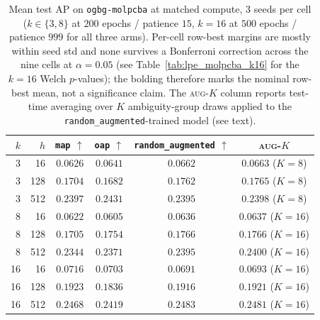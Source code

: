 \documentclass{article}
\theoremstyle{definition}
\theoremstyle{plain}
\begin{document}
\begin{table}[h]
\centering
\caption{Mean test AP on \texttt{ogbg-molpcba} at matched compute,
$3$ seeds per cell ($k\!\in\!\{3,8\}$ at $200$ epochs / patience $15$,
$k\!=\!16$ at $500$ epochs / patience $999$ for all three arms).
Per-cell row-best margins are mostly within seed std and none survives
a Bonferroni correction across the nine cells at $\alpha\!=\!0.05$
(see Table~\ref{tab:lpe_molpcba_k16} for the $k\!=\!16$ Welch
$p$-values); the bolding therefore marks the nominal row-best mean,
not a significance claim. The \textsc{aug-$K$} column reports
test-time averaging over $K$ ambiguity-group draws applied to the
\texttt{random\_augmented}-trained model (see text).}
\label{tab:lpe_molpcba_main}
\begin{tabular}{rrcccc}
\toprule
$k$  &  $h$  & \texttt{map} $\uparrow$ & \texttt{oap} $\uparrow$ & \texttt{random\_augmented} $\uparrow$ & \textsc{aug-$K$} \\
\midrule
 3   &   16  & $0.0626$        & $0.0641$        & $\mathbf{0.0662}$           & $0.0663$ ($K\!=\!8$)  \\
 3   &  128  & $0.1704$        & $0.1682$        & $\mathbf{0.1762}$           & $0.1765$ ($K\!=\!8$)  \\
 3   &  512  & $0.2397$        & $\mathbf{0.2431}$ & $0.2395$                  & $0.2398$ ($K\!=\!8$)  \\
\midrule
 8   &   16  & $0.0622$        & $0.0605$        & $\mathbf{0.0636}$           & $0.0637$ ($K\!=\!16$) \\
 8   &  128  & $0.1705$        & $0.1754$        & $\mathbf{0.1766}$           & $0.1766$ ($K\!=\!16$) \\
 8   &  512  & $0.2344$        & $0.2371$        & $\mathbf{0.2395}$           & $0.2400$ ($K\!=\!16$) \\
\midrule
16   &   16  & $\mathbf{0.0716}$ & $0.0703$      & $0.0691$                    & $0.0693$ ($K\!=\!16$) \\
16   &  128  & $\mathbf{0.1923}$ & $0.1836$      & $0.1916$                    & $0.1921$ ($K\!=\!16$) \\
16   &  512  & $0.2468$        & $0.2419$        & $\mathbf{0.2483}$           & $0.2481$ ($K\!=\!16$) \\
\bottomrule
\end{tabular}
\end{table}
\end{document}
